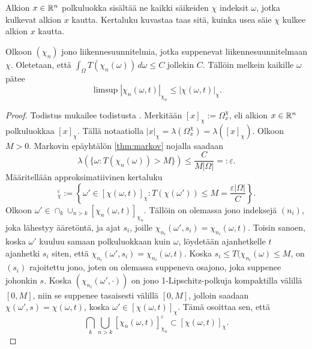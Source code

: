 \documentclass[12pt,oneside,a4paper]{amsbook} %
\begin{document}
Alkion $x\in \mathbb{R}^n$ polkuluokka sisältää ne kaikki säikeiden $\chi$ indeksit $\omega$, jotka kulkevat alkion $x$ kautta. Kertaluku kuvastaa taas sitä, kuinka usea säie $\chi$ kulkee alkion $x$ kautta.

\begin{theorem} \label{thm:multiplicityXnLeX}
    Olkoon $(\chi_n)$ jono liikennesuunnitelmia, jotka suppenevat liikennesuunnitelmaan $\chi$. Oletetaan, että $\int_\Omega T(\chi_n(\omega))\, d\omega \le C$ jollekin $C$. Tällöin melkein kaikille $\omega$ pätee
    \begin{equation*}
        \limsup |\chi_n(\omega, t)|_{\chi_n} \le |\chi(\omega, t)|_\chi.
    \end{equation*}
\end{theorem}
\begin{proof}
    Todistus mukailee todistusta \cite[s. 31-32]{optimal}. Merkitään $[x]_\chi := \Omega_x^\chi$, eli alkion $x\in \mathbb{R}^n$ polkuluokkaa $[x]_\chi$. Tällä notaatiolla $|x|_\chi = \lambda(\Omega_x^\chi) = \lambda([x]_\chi)$. Olkoon $M > 0.$ Markovin epäyhtälön \ref{thm:markov} nojalla saadaan
    \begin{equation*}
        \lambda(\{\omega : T(\chi_n(\omega)) > M\}) \le \frac{C}{M|\Omega|} =: \varepsilon.
    \end{equation*}
    Määritellään approksimatiivinen kertaluku
    \begin{equation*}
        [\chi(\omega,t)]_\chi^\varepsilon := \left\{\omega' \in [\chi(\omega, t)]_\chi : T(\chi(\omega')) \le M = \frac{\varepsilon|\Omega|}{C}\right\}.
    \end{equation*}
    Olkoon $\omega' \in \cap_k \cup_{n > k} [\chi_n(\omega, t)]_{\chi_n}$. Tällöin on olemassa jono  indeksejä $(n_i)$, joka lähestyy ääretöntä, ja ajat $s_i$, joille $\chi_{n_i}(\omega',s_i) = \chi_{n_i}(\omega, t)$. Toisin sanoen, koska $\omega'$ kuuluu samaan polkuluokkaan kuin $\omega$, löydetään ajanhetkelle $t$ ajanhetki $s_i$ siten, että $\chi_{n_i}(\omega',s_i) = \chi_{n_i}(\omega, t)$. Koska $s_i\le T(\chi_{n_i}(\omega) \le M$, on $(s_i)$ rajoitettu jono, joten on olemassa suppeneva osajono, joka suppenee johonkin $s$. Koska $(\chi_{n_i}(\omega', \cdot))$ on jono 1-Lipschitz-polkuja kompaktilla välillä $[0, M]$, niin se suppenee tasaisesti välillä $[0, M]$, jolloin saadaan $\chi(\omega', s) = \chi(\omega, t)$, koska $\omega' \in [\chi(\omega, t)]_\chi$. Tämä osoittaa sen, että 
    \begin{equation}\label{eq:multiplicityOfXn1}
        \bigcap_k \bigcup_{n > k} [\chi_n(\omega, t)]_{\chi_n}^\varepsilon \subset [\chi(\omega, t)]_\chi.
    \end{equation}
    

\end{proof}
\end{document}
